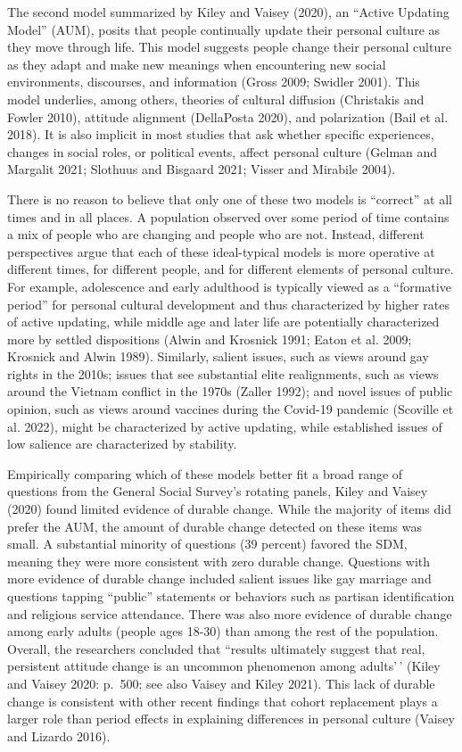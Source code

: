 \documentclass[
  12pt,
]{article}
\begin{document}
The second model summarized by Kiley and Vaisey (2020), an ``Active
Updating Model'' (AUM), posits that people continually update their
personal culture as they move through life. This model suggests people
change their personal culture as they adapt and make new meanings when
encountering new social environments, discourses, and information (Gross
2009; Swidler 2001). This model underlies, among others, theories of
cultural diffusion (Christakis and Fowler 2010), attitude alignment
(DellaPosta 2020), and polarization (Bail et al. 2018). It is also
implicit in most studies that ask whether specific experiences, changes
in social roles, or political events, affect personal culture (Gelman
and Margalit 2021; Slothuus and Bisgaard 2021; Visser and Mirabile
2004).

There is no reason to believe that only one of these two models is
``correct'' at all times and in all places. A population observed over
some period of time contains a mix of people who are changing and people
who are not. Instead, different perspectives argue that each of these
ideal-typical models is more operative at different times, for different
people, and for different elements of personal culture. For example,
adolescence and early adulthood is typically viewed as a ``formative
period'' for personal cultural development and thus characterized by
higher rates of active updating, while middle age and later life are
potentially characterized more by settled dispositions (Alwin and
Krosnick 1991; Eaton et al. 2009; Krosnick and Alwin 1989). Similarly,
salient issues, such as views around gay rights in the 2010s; issues
that see substantial elite realignments, such as views around the
Vietnam conflict in the 1970s (Zaller 1992); and novel issues of public
opinion, such as views around vaccines during the Covid-19 pandemic
(Scoville et al. 2022), might be characterized by active updating, while
established issues of low salience are characterized by stability.

Empirically comparing which of these models better fit a broad range of
questions from the General Social Survey's rotating panels, Kiley and
Vaisey (2020) found limited evidence of durable change. While the
majority of items did prefer the AUM, the amount of durable change
detected on these items was small. A substantial minority of questions
(39 percent) favored the SDM, meaning they were more consistent with
zero durable change. Questions with more evidence of durable change
included salient issues like gay marriage and questions tapping
``public'' statements or behaviors such as partisan identification and
religious service attendance. There was also more evidence of durable
change among early adults (people ages 18-30) than among the rest of the
population. Overall, the researchers concluded that ``results ultimately
suggest that real, persistent attitude change is an uncommon phenomenon
among adults'\,' (Kiley and Vaisey 2020: p.~500; see also Vaisey and
Kiley 2021). This lack of durable change is consistent with other recent
findings that cohort replacement plays a larger role than period effects
in explaining differences in personal culture (Vaisey and Lizardo 2016).
\end{document}
